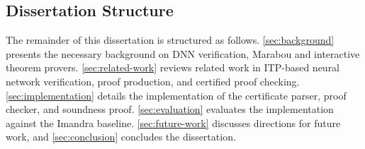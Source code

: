 \subsection{Dissertation Structure}

The remainder of this dissertation is structured as follows. \autoref{sec:background} presents the necessary background on DNN verification, Marabou and interactive theorem provers. \autoref{sec:related-work} reviews related work in ITP-based neural network verification, proof production, and certified proof checking.  \autoref{sec:implementation} details the implementation of the certificate parser, proof checker, and soundness proof. \autoref{sec:evaluation} evaluates the implementation against the Imandra baseline. \autoref{sec:future-work} discusses directions for future work, and \autoref{sec:conclusion} concludes the dissertation.

